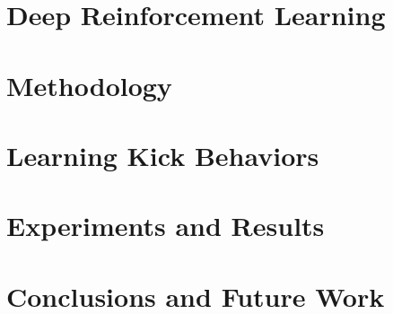 \documentclass[tg, eng]{ita}    %
\begin{document}
%

\chapter{Deep Reinforcement Learning}
\label{chap:deep_rl}


\chapter{Methodology}
\label{chap:method}


\chapter{Learning Kick Behaviors}
\label{chap:contributions}


\chapter{Experiments and Results}
\label{chap:experiments}


\chapter{Conclusions and Future Work}
\label{chap:conclusions}


\renewcommand\bibname{\itareferencesnamebabel} %


%

%

\end{document}
